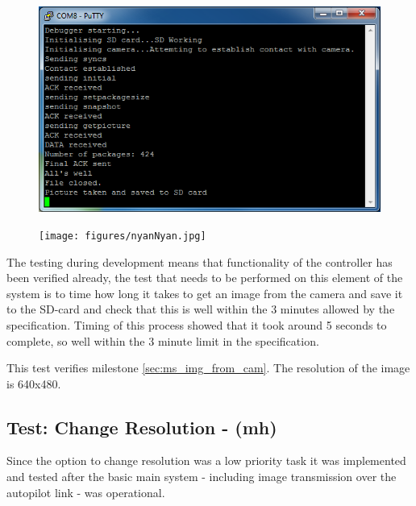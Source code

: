 \begin{figure}[H]
        \centering
        \includegraphics[width=1.00\textwidth]{testing_screenshots/camera_image_saving_sd_card_test.png}
        \label{fig:test_camera_image_saving_sd_card}
\end{figure}

\begin{figure}[H]
        \centering
        \texttt{[image: figures/nyanNyan.jpg]}
        \label{fig:Nyan1}
\end{figure}

The testing during development means that functionality of the controller has been verified already, the test that needs to be performed on this element of the system is to time how long it takes to get an image from the camera and save it to the SD-card and check that this is well within the 3 minutes allowed by the specification. Timing of this process showed that it took around 5 seconds to complete, so well within the 3 minute limit in the specification.

This test verifies milestone \ref{sec:ms_img_from_cam}. The resolution of the image is 640x480.

\subsection{Test: Change Resolution - (mh)}
\label{sec:test_change_resolution}

Since the option to change resolution was a low priority task it was implemented and tested after the basic main system - including image transmission over the autopilot link - was operational.

